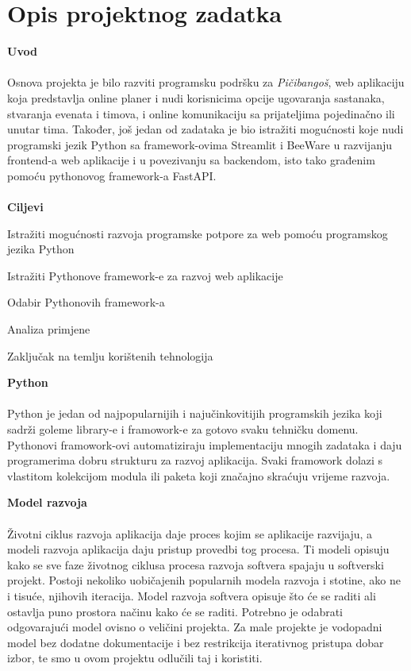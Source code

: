 \chapter{Opis projektnog zadatka}

		\noindent\textbf{Uvod}\\
		\\
		Osnova projekta je bilo razviti programsku podršku za \textit{Pičibangoš}, web aplikaciju koja predstavlja online planer i nudi korisnicima opcije ugovaranja sastanaka, stvaranja evenata i timova, i online komunikaciju sa prijateljima pojedinačno ili unutar tima. Također, još jedan od zadataka je bio istražiti mogućnosti koje nudi programski jezik Python sa framework-ovima Streamlit i BeeWare u razvijanju frontend-a web aplikacije i u povezivanju sa backendom, isto tako građenim pomoću pythonovog framework-a FastAPI.\\
		\\


		\noindent \textbf{Ciljevi}
		\begin{packed_item}

			\item Istražiti mogućnosti razvoja programske potpore za web pomoću programskog jezika Python
			\item Istražiti Pythonove framework-e za razvoj web aplikacije
			\item Odabir Pythonovih framework-a
			\item Analiza primjene
			\item Zaključak na temlju korištenih tehnologija
		\end{packed_item}
		\bigskip

		\noindent\textbf{Python}\\
		\\
		Python je jedan od najpopularnijih i najučinkovitijih programskih jezika koji sadrži goleme library-e i framowork-e za gotovo svaku tehničku domenu. Pythonovi framowork-ovi automatiziraju implementaciju mnogih zadataka i daju programerima dobru strukturu za razvoj aplikacija. Svaki framowork dolazi s vlastitom kolekcijom modula ili paketa koji značajno skraćuju vrijeme razvoja.\\
		\pagebreak

		\noindent\textbf{Model razvoja}\\
		\\
		Životni ciklus razvoja aplikacija daje proces kojim se aplikacije razvijaju, a modeli
		razvoja aplikacija daju pristup provedbi tog procesa. Ti modeli opisuju kako se sve faze
		životnog ciklusa procesa razvoja softvera spajaju u softverski projekt. Postoji nekoliko
		uobičajenih popularnih modela razvoja i stotine, ako ne i tisuće, njihovih iteracija. Model
		razvoja softvera opisuje što će se raditi ali ostavlja puno prostora načinu kako će se raditi.
		Potrebno je odabrati odgovarajući model ovisno o veličini projekta. Za male projekte je vodopadni model
		bez dodatne dokumentacije i bez restrikcija iterativnog pristupa dobar izbor, te smo u ovom projektu odlučili taj i koristiti.
		\pagebreak

